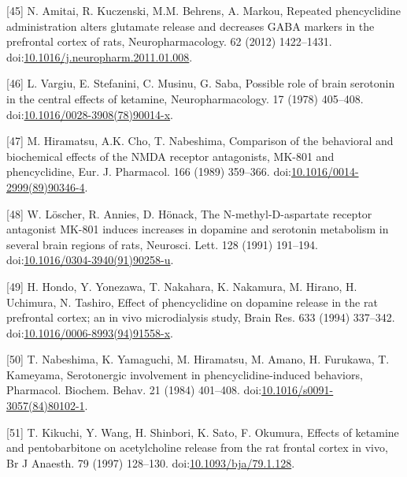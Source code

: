 \documentclass[man]{apa6}
\begin{document}
\leavevmode\hypertarget{ref-amitaiRepeatedPhencyclidineAdministration2012}{}%
{[}45{]} N. Amitai, R. Kuczenski, M.M. Behrens, A. Markou, Repeated phencyclidine administration alters glutamate release and decreases GABA markers in the prefrontal cortex of rats, Neuropharmacology. 62 (2012) 1422--1431. doi:\href{https://doi.org/10.1016/j.neuropharm.2011.01.008}{10.1016/j.neuropharm.2011.01.008}.

\leavevmode\hypertarget{ref-vargiuPossibleRoleBrain1978}{}%
{[}46{]} L. Vargiu, E. Stefanini, C. Musinu, G. Saba, Possible role of brain serotonin in the central effects of ketamine, Neuropharmacology. 17 (1978) 405--408. doi:\href{https://doi.org/10.1016/0028-3908(78)90014-x}{10.1016/0028-3908(78)90014-x}.

\leavevmode\hypertarget{ref-hiramatsuComparisonBehavioralBiochemical1989}{}%
{[}47{]} M. Hiramatsu, A.K. Cho, T. Nabeshima, Comparison of the behavioral and biochemical effects of the NMDA receptor antagonists, MK-801 and phencyclidine, Eur. J. Pharmacol. 166 (1989) 359--366. doi:\href{https://doi.org/10.1016/0014-2999(89)90346-4}{10.1016/0014-2999(89)90346-4}.

\leavevmode\hypertarget{ref-loscherNmethylDaspartateReceptorAntagonist1991}{}%
{[}48{]} W. Löscher, R. Annies, D. Hönack, The N-methyl-D-aspartate receptor antagonist MK-801 induces increases in dopamine and serotonin metabolism in several brain regions of rats, Neurosci. Lett. 128 (1991) 191--194. doi:\href{https://doi.org/10.1016/0304-3940(91)90258-u}{10.1016/0304-3940(91)90258-u}.

\leavevmode\hypertarget{ref-hondoEffectPhencyclidineDopamine1994}{}%
{[}49{]} H. Hondo, Y. Yonezawa, T. Nakahara, K. Nakamura, M. Hirano, H. Uchimura, N. Tashiro, Effect of phencyclidine on dopamine release in the rat prefrontal cortex; an in vivo microdialysis study, Brain Res. 633 (1994) 337--342. doi:\href{https://doi.org/10.1016/0006-8993(94)91558-x}{10.1016/0006-8993(94)91558-x}.

\leavevmode\hypertarget{ref-nabeshimaSerotonergicInvolvementPhencyclidineinduced1984}{}%
{[}50{]} T. Nabeshima, K. Yamaguchi, M. Hiramatsu, M. Amano, H. Furukawa, T. Kameyama, Serotonergic involvement in phencyclidine-induced behaviors, Pharmacol. Biochem. Behav. 21 (1984) 401--408. doi:\href{https://doi.org/10.1016/s0091-3057(84)80102-1}{10.1016/s0091-3057(84)80102-1}.

\leavevmode\hypertarget{ref-kikuchiEffectsKetaminePentobarbitone1997}{}%
{[}51{]} T. Kikuchi, Y. Wang, H. Shinbori, K. Sato, F. Okumura, Effects of ketamine and pentobarbitone on acetylcholine release from the rat frontal cortex in vivo, Br J Anaesth. 79 (1997) 128--130. doi:\href{https://doi.org/10.1093/bja/79.1.128}{10.1093/bja/79.1.128}.
\end{document}
